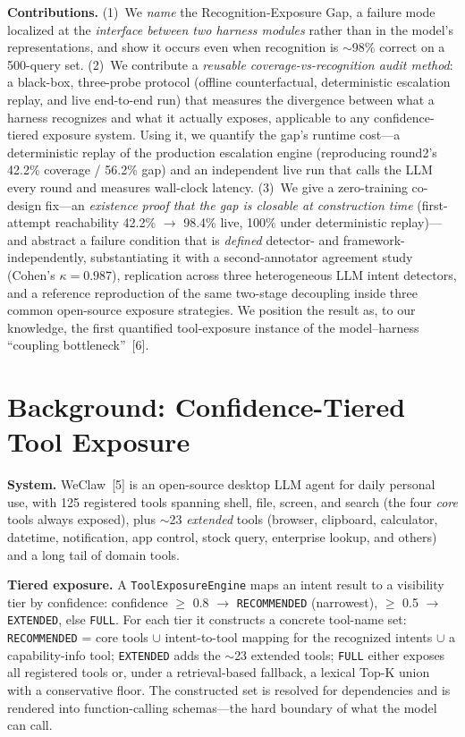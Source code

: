 \textbf{Contributions.} (1)~We \emph{name} the Recognition-Exposure Gap, a failure mode localized at the \emph{interface between two harness modules} rather than in the model's representations, and show it occurs even when recognition is $\sim$98\% correct on a 500-query set. (2)~We contribute a \emph{reusable coverage-vs-recognition audit method}: a black-box, three-probe protocol (offline counterfactual, deterministic escalation replay, and live end-to-end run) that measures the divergence between what a harness recognizes and what it actually exposes, applicable to any confidence-tiered exposure system. Using it, we quantify the gap's runtime cost---a deterministic replay of the production escalation engine (reproducing round2's 42.2\% coverage / 56.2\% gap) and an independent live run that calls the LLM every round and measures wall-clock latency. (3)~We give a zero-training co-design fix---an \emph{existence proof that the gap is closable at construction time} (first-attempt reachability 42.2\% $\rightarrow$ 98.4\% live, 100\% under deterministic replay)---and abstract a failure condition that is \emph{defined} detector- and framework-independently, substantiating it with a second-annotator agreement study (Cohen's $\kappa=0.987$), replication across three heterogeneous LLM intent detectors, and a reference reproduction of the same two-stage decoupling inside three common open-source exposure strategies. We position the result as, to our knowledge, the first quantified tool-exposure instance of the model--harness ``coupling bottleneck''~[6].

\section{Background: Confidence-Tiered Tool Exposure}
\label{sec:background}

\textbf{System.} WeClaw~[5] is an open-source desktop LLM agent for daily personal use, with 125 registered tools spanning shell, file, screen, and search (the four \emph{core} tools always exposed), plus $\sim$23 \emph{extended} tools (browser, clipboard, calculator, datetime, notification, app control, stock query, enterprise lookup, and others) and a long tail of domain tools.

\textbf{Tiered exposure.} A \texttt{ToolExposureEngine} maps an intent result to a visibility tier by confidence: confidence $\geq$ 0.8 $\rightarrow$ \texttt{RECOMMENDED} (narrowest), $\geq$ 0.5 $\rightarrow$ \texttt{EXTENDED}, else \texttt{FULL}. For each tier it constructs a concrete tool-name set: \texttt{RECOMMENDED} = core tools $\cup$ intent-to-tool mapping for the recognized intents $\cup$ a capability-info tool; \texttt{EXTENDED} adds the $\sim$23 extended tools; \texttt{FULL} either exposes all registered tools or, under a retrieval-based fallback, a lexical Top-K union with a conservative floor. The constructed set is resolved for dependencies and is rendered into function-calling schemas---the hard boundary of what the model can call.

